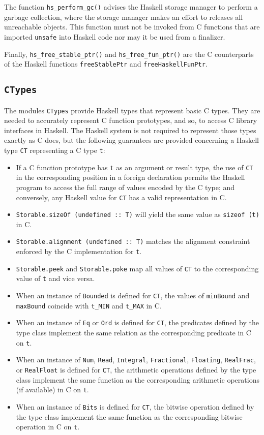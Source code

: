 \documentclass[a4paper,twoside]{article}
\newcommand{\code}[1]{\texttt{#1}}      %
\begin{document}
The function \code{hs\_perform\_gc()} advises the Haskell storage manager to
perform a garbage collection, where the storage manager makes an effort to
releases all unreachable objects.  This function must not be invoked from C
functions that are imported \code{unsafe} into Haskell code nor may it be used
from a finalizer.

Finally, \code{hs\_free\_stable\_ptr()} and \code{hs\_free\_fun\_ptr()} are
the C counterparts of the Haskell functions \code{freeStablePtr} and
\code{freeHaskellFunPtr}.

\subsection{\code{CTypes}}
\label{sec:CTypes}

The modules \code{CTypes} provide Haskell types that represent basic C types.
They are needed to accurately represent C function prototypes, and so, to
access C library interfaces in Haskell.  The Haskell system is not required to
represent those types exactly as C does, but the following guarantees are
provided concerning a Haskell type \code{CT} representing a C type \code{t}:
%
\begin{itemize}
\item If a C function prototype has \code{t} as an argument or result type,
  the use of \code{CT} in the corresponding position in a foreign declaration
  permits the Haskell program to access the full range of values encoded by
  the C type; and conversely, any Haskell value for \code{CT} has a valid
  representation in C.
\item \code{Storable.sizeOf (undefined ::\ T)} will yield the same value as
  \code{sizeof (t)} in C.
\item \code{Storable.alignment (undefined ::\ T)} matches the alignment
  constraint enforced by the C implementation for \code{t}.
\item \code{Storable.peek} and \code{Storable.poke} map all values of
  \code{CT} to the corresponding value of \code{t} and vice versa.
\item When an instance of \code{Bounded} is defined for \code{CT}, the values
  of \code{minBound} and \code{maxBound} coincide with \code{t\_MIN} and
  \code{t\_MAX} in C.
\item When an instance of \code{Eq} or \code{Ord} is defined for \code{CT},
  the predicates defined by the type class implement the same relation as the
  corresponding predicate in C on \code{t}.
\item When an instance of \code{Num}, \code{Read}, \code{Integral},
  \code{Fractional}, \code{Floating}, \code{RealFrac}, or \code{RealFloat} is
  defined for \code{CT}, the arithmetic operations defined by the type class
  implement the same function as the corresponding arithmetic operations (if
  available) in C on \code{t}.
\item When an instance of \code{Bits} is defined for \code{CT}, the bitwise
  operation defined by the type class implement the same function as the
  corresponding bitwise operation in C on \code{t}.
\end{itemize}
\end{document}
